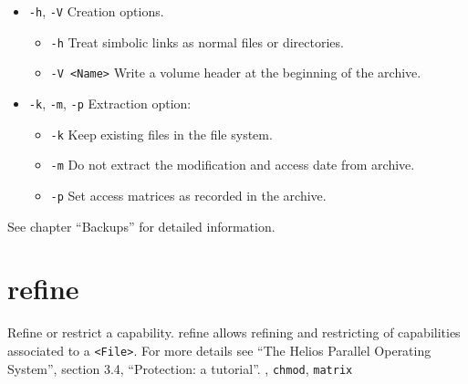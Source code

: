              \begin{itemize}
             \item {\tt -h}, {\tt -V}\newline
               Creation options.

               \begin{itemize}
               \item {\tt -h}\newline
                 Treat simbolic links as normal files or directories.

               \item {\tt -V <Name>}\newline
                 Write a volume header at the beginning of the archive.
               \end{itemize}

             \item {\tt -k}, {\tt -m}, {\tt -p}\newline
               Extraction option:

               \begin{itemize}
               \item {\tt -k}\newline
                 Keep existing files in the file system.

               \item {\tt -m}\newline
                 Do not extract the modification and access date from archive.

               \item {\tt -p}\newline
                 Set access matrices as recorded in the archive.
               \end{itemize}
             \end{itemize}

             See chapter ``Backups'' for detailed information.
\newpage

\section{refine}
\begin{man}
  \PP Refine or restrict a capability.
  \DE refine allows refining and restricting of capabilities associated
             to a {\tt <File>}. For more details see ``The Helios Parallel
             Operating System'', section 3.4, ``Protection: a tutorial''.
  , {\tt chmod}, {\tt matrix}
\end{man}

